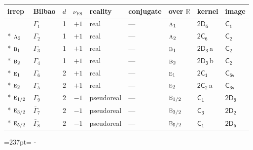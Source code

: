 \documentclass[10pt,a4paper]{article}
\makeatletter
\def\grouprule#1#2{\noalign{\marks\LTgroupmarks{\the\belowrulesep}\nobreak\vskip#1%
  \vskip\aboverulesep}\multispan\LT@cols\unskip{\leaders\hrule\@height#2\hfill\kern\z@}\cr
  \noalign{\penalty\LTrulebreak\vskip\belowrulesep\global\@lastruleclass\z@}}
\newcommand{\needspace}[1]{\par\penalty-100\begingroup\dimen0=#1\relax\dimen2=\pagegoal
  \advance\dimen2-\pagetotal\ifdim\dimen0>\dimen2\relax\ifdim\dimen2>0pt\vfil\break\fi\fi
  \endgroup}
\numberwithin{equation}{section}
\newcommand{\grp}[1]{\mathsf{#1}}
\newcommand{\irr}[1]{\text{\normalfont\scshape #1}}
\newcommand{\detbox}[1]{{\setlength{\fboxsep}{1pt}\fbox{#1}}}
\newcommand{\clsletter}[1]{\,{\scriptsize\color{black!55}#1}}
\newcommand{\fsind}{\nu_{\mathrm{FS}}}
\makeatother
\begin{document}
{\small\renewcommand{\arraystretch}{1.25}\setlength{\tabcolsep}{4pt}\begin{longtable}{@{}llrrlllll@{}}\toprule
irrep & Bilbao & $d$ & $\fsind$ & reality & conjugate & over $\mathbb{R}$ & kernel & image\\\midrule\endhead
\bottomrule\endfoot\endlastfoot
\detbox{$\irr{a}_{1}$} & $\Gamma_{1}$ & 1 & $+1$ & real & --- & $\irr{a}_{1}$ & \href{2D6.pdf}{$\grp{2D_{6}}$} & \href{../../../rotation/data/pdf/C1.pdf}{$\grp{C_{1}}$}\\*
$\irr{a}_{2}$ & $\Gamma_{2}$ & 1 & $+1$ & real & --- & $\irr{a}_{2}$ & \href{2C6.pdf}{$\grp{2C_{6}}$} & \href{../../../rotation/data/pdf/C2.pdf}{$\grp{C_{2}}$}\\*
$\irr{b}_{1}$ & $\Gamma_{3}$ & 1 & $+1$ & real & --- & $\irr{b}_{1}$ & \href{2D3.pdf}{$\grp{2D_{3}}$}\clsletter{a} & \href{../../../rotation/data/pdf/C2.pdf}{$\grp{C_{2}}$}\\*
$\irr{b}_{2}$ & $\Gamma_{4}$ & 1 & $+1$ & real & --- & $\irr{b}_{2}$ & \href{2D3.pdf}{$\grp{2D_{3}}$}\clsletter{b} & \href{../../../rotation/data/pdf/C2.pdf}{$\grp{C_{2}}$}\\*
$\irr{e}_{1}$ & $\Gamma_{6}$ & 2 & $+1$ & real & --- & $\irr{e}_{1}$ & \href{2C1.pdf}{$\grp{2C_{1}}$} & \href{../../../rotation/data/pdf/C6v.pdf}{$\grp{C_{6v}}$}\\*
$\irr{e}_{2}$ & $\Gamma_{5}$ & 2 & $+1$ & real & --- & $\irr{e}_{2}$ & \href{2C2.pdf}{$\grp{2C_{2}}$}\clsletter{a} & \href{../../../rotation/data/pdf/C3v.pdf}{$\grp{C_{3v}}$}\\*
\grouprule{0pt}{\lightrulewidth}
$\irr{e}_{1/2}$ & $\bar{\Gamma}_{9}$ & 2 & $-1$ & pseudoreal & --- & $\irr{e}_{1/2}$ & \href{C1.pdf}{$\grp{C_{1}}$} & \href{2D6.pdf}{$\grp{2D_{6}}$}\\*
$\irr{e}_{3/2}$ & $\bar{\Gamma}_{7}$ & 2 & $-1$ & pseudoreal & --- & $\irr{e}_{3/2}$ & \href{C3.pdf}{$\grp{C_{3}}$} & \href{2D2.pdf}{$\grp{2D_{2}}$}\\*
$\irr{e}_{5/2}$ & $\bar{\Gamma}_{8}$ & 2 & $-1$ & pseudoreal & --- & $\irr{e}_{5/2}$ & \href{C1.pdf}{$\grp{C_{1}}$} & \href{2D6.pdf}{$\grp{2D_{6}}$}\\
\bottomrule\end{longtable}}
\needspace{237pt}
\end{document}
